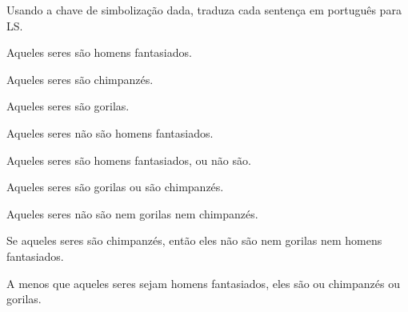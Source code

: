 \practiceproblems

\solutions
\problempart Usando a chave de simbolização dada, traduza cada sentença em português para LS.
\label{pr.monkeysuits}
\begin{ekey}
\item[M:] Aqueles seres são homens fantasiados.
\item[C:] Aqueles seres são chimpanzés.
\item[G:] Aqueles seres são gorilas.
\end{ekey}
\begin{earg}
\item Aqueles seres não são homens fantasiados.
\item Aqueles seres são homens fantasiados, ou não são.
\item Aqueles seres são gorilas ou são chimpanzés.
\item Aqueles seres não são nem gorilas nem chimpanzés.
\item Se aqueles seres são chimpanzés, então eles não são nem gorilas nem homens fantasiados.
\item A menos que aqueles seres sejam homens fantasiados, eles são ou chimpanzés ou gorilas.
\end{earg}


